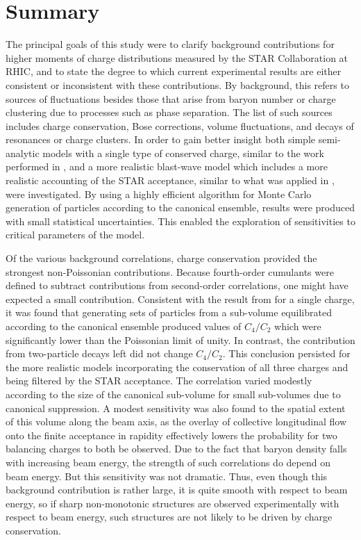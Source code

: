 
\section{Summary}\label{sec:summary}
 
The principal goals of this study were to clarify background contributions for higher moments of charge distributions measured by the STAR Collaboration at RHIC, and to state the degree to which current experimental results are either consistent or inconsistent with these contributions. By background, this refers to sources of fluctuations besides those that arise from baryon number or charge clustering due to processes such as phase separation. The list of such sources includes charge conservation, Bose corrections, volume fluctuations, and decays of resonances or charge clusters. In order to gain better insight both simple semi-analytic models with a single type of conserved charge, similar to the work performed in \cite{Savchuk:2019xfg}, and a more realistic blast-wave model which includes a more realistic accounting of the STAR acceptance, similar to what was applied in \cite{Oliinychenko:2020cmr}, were investigated. By using a highly efficient algorithm for Monte Carlo generation of particles according to the canonical ensemble, results were produced with small statistical uncertainties. This enabled the exploration of sensitivities to critical parameters of the model.

Of the various background correlations, charge conservation provided the strongest non-Poissonian contributions. Because fourth-order cumulants were defined to subtract contributions from second-order correlations, one might have expected a small contribution. Consistent with the result from \cite{Savchuk:2019xfg} for a single charge, it was found that generating sets of particles from a sub-volume equilibrated according to the canonical ensemble produced values of $C_4/C_2$ which were significantly lower than the Poissonian limit of unity. In contrast, the contribution from two-particle decays left did not change $C_4/C_2$. This conclusion persisted for the more realistic models incorporating the conservation of all three charges and being filtered by the STAR acceptance. The correlation varied modestly according to the size of the canonical sub-volume for small sub-volumes due to canonical suppression. A modest sensitivity was also found to the spatial extent of this volume along the beam axis, as the overlay of collective longitudinal flow onto the finite acceptance in rapidity effectively lowers the probability for two balancing charges to both be observed. Due to the fact that baryon density falls with increasing beam energy, the strength of such correlations do depend on beam energy. But this sensitivity was not dramatic. Thus, even though this background contribution is rather large, it is quite smooth with respect to beam energy, so if sharp non-monotonic structures are observed experimentally with respect to beam energy, such structures are not likely to be driven by charge conservation. 

